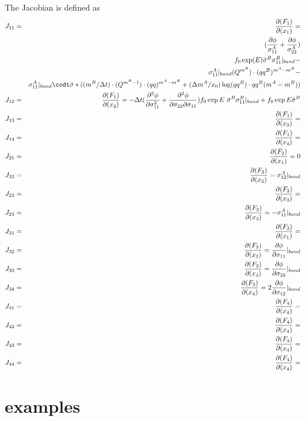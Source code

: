 \documentclass[12pt]{amsart}
\begin{document}
The Jacobian is defined as
\begin{eqnarray}
  \label{eq:jacobian_fld2}
  J_{11}&=&\frac{\partial(F_1)}{\partial(x_1)}=\\
       & &(\frac{\partial\phi}{\sigma_{11}^A}+\frac{\partial\phi}{\sigma_{22}^A})\nonumber\\
       & &f_0\exp(E)\bar{\sigma}^B\sigma_{11}^B|_{band}- \nonumber \\
       & &\sigma^A_{11}|_{band}(Q^{m^B})\cdot (qq^B)^{m^A-m^B}-\nonumber \\
       & &\sigma^A_{11}|_{band}\codt\bar{\sigma}*((m^B/\Delta t)\cdot (Q^{m^B-1})\cdot (qq)^{m^A-m^B}+(\Delta m^A/x_0)\log(qq^B)\cdot{qq^B}(m^A-m^B))\nonumber\\
  J_{12}&=&\frac{\partial(F_1)}{\partial(x_2)}=-\Delta{t} (\frac{\partial^2\phi}{\partial\sigma_{11}^2}+\frac{\partial^2\phi}{\partial\sigma_{22}\partial\sigma_{11}})f_0\exp{E}\ \bar{\sigma}^B\sigma^B_{11}|_{band}+f_0\exp{E}\bar{\sigma}^B\nonumber\\
  J_{13}&=&\frac{\partial(F_1)}{\partial(x_3)}=\nonumber\\
  J_{14}&=&\frac{\partial(F_1)}{\partial(x_4)}=\nonumber\\
  J_{21}&=&\frac{\partial(F_2)}{\partial(x_1)}=0\nonumber\\
  J_{22}&=&\frac{\partial(F_2)}{\partial(x_2)}=\sigma_{12}^A|_{band}\nonumber\\
  J_{23}&=&\frac{\partial(F_2)}{\partial(x_3)}=\nonumber\\
  J_{24}&=&\frac{\partial(F_2)}{\partial(x_3)}=-\sigma_{11}^A|_{band}\nonumber\\
  J_{31}&=&\frac{\partial(F_3)}{\partial(x_1)}=\nonumber\\
  J_{32}&=&\frac{\partial(F_3)}{\partial(x_2)}=\frac{\partial\phi}{\partial\sigma_{11}}|_{band}\nonumber\\
  J_{33}&=&\frac{\partial(F_3)}{\partial(x_3)}=\frac{\partial\phi}{\partial\sigma_{22}}|_{band}\nonumber\\
  J_{34}&=&\frac{\partial(F_3)}{\partial(x_4)}=2\frac{\partial\phi}{\partial\sigma_{12}}|_{band}\nonumber\\
  J_{41}&=&\frac{\partial(F_4)}{\partial(x_4)}=\nonumber\\
  J_{42}&=&\frac{\partial(F_4)}{\partial(x_4)}=\nonumber\\
  J_{43}&=&\frac{\partial(F_4)}{\partial(x_4)}=\nonumber\\
  J_{44}&=&\frac{\partial(F_4)}{\partial(x_4)}=\nonumber
\end{eqnarray}

\section{examples}
\end{document}
